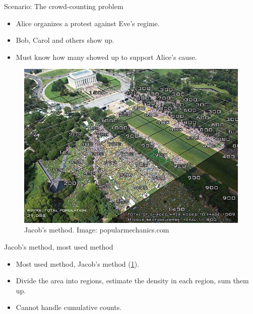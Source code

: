 \begin{columns}[t]

  \begin{column}{0.32\linewidth}

    \begin{blueblock}{Scenario: The crowd-counting problem}
      \begin{itemize}
        \item Alice organizes a protest against Eve's regime.
        \item Bob, Carol and others show up.
        \item Must know how many showed up to support Alice's cause.
      \end{itemize}
    \end{blueblock}

    \begin{figure}
      \centering
      \includegraphics[width=0.9\linewidth]{fig/Jacobs-method.jpg}
      \caption{%
        Jacob's method. Image: popularmechanics.com
      }\label{JacobsMethod}
    \end{figure}

    \begin{whiteblock}{Jacob's method, most used method}
      \begin{itemize}
        \item Most used method, Jacob's method (\cref{JacobsMethod}).
        \item Divide the area into regions, estimate the density in each 
          region, sum them up.
        \item \color{red} Cannot handle cumulative counts.
      \end{itemize}
    \end{whiteblock}


\end{column}
\end{columns}
